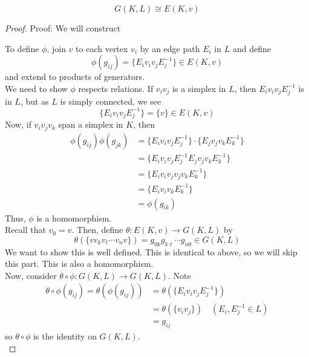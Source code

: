 
\begin{theorem}
    \[ G(K, L) \cong E(K, v) \]
\end{theorem}
\begin{proof}{Proof:}
    We will construct
    \begin{center}
    \end{center}
    To define $\phi$, join $v$ to each vertex $v_i$ by an edge path $E_i$ in $L$
    and define
    \[ \phi(g_{ij}) = \{E_i v_i v_j E_j^{-1}\} \in E(K, v) \]
    and extend to products of generators.\\


    We need to show $\phi$ respects relations. If $v_i v_j$ is a simplex in $L$, then $E_i v_i v_j E_j^{-1}$ is in $L$, but as $L$ is simply connected, we see
    \[ \{E_i v_i v_j E_j^{-1}\} = \{v\} \in E(K, v) \]
    Now, if $v_i v_j v_k$ span a simplex in $K$, then
    \begin{align*}
        \phi(g_{ij})\phi(g_{jk}) &= \{E_i v_i v_j E_j^{-1}\} \cdot \{E_j v_j v_k E_k^{-1}\}\\
        &= \{E_i v_i v_j E_j^{-1} E_j v_j v_k E_k^{-1}\}\\
        &= \{E_i v_i v_j v_j v_k E_k^{-1}\}\\
        &= \{E_i v_i v_k E_k^{-1}\}\\
        &= \phi(g_{ik})
    \end{align*}
    Thus, $\phi$ is a homomorphism.\\

    Recall that $v_0 = v$. Then, define $\theta : E(K, v) \to G(K, L)$ by
    \[ \theta(\{v v_k v_{\ell} \cdots v_n v\}) = g_{0k}g_{k\ell} \cdots g_{n0} \in G(K, L) \]
    We want to show this is well defined. This is identical to above, so we will skip this part. This is also a homomorphism.\\


    Now, consider $\theta \circ \phi : G(K, L) \to G(K, L)$. Note
    \begin{align*}
        \theta \circ \phi(g_{ij}) = \theta(\phi(g_{ij})) &= \theta(\{E_i v_i v_j E_j^{-1}\})\\
        &= \theta(\{v_i v_j\}) \quad (E_i, E_j^{-1} \in L)\\
        &= g_{ij}
    \end{align*}
    so $\theta \circ \phi$ is the identity on $G(K, L)$.\\


\end{proof}
